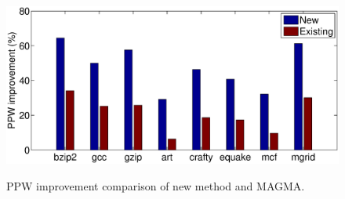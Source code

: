 



\begin{figure}
\centering
\includegraphics[width=1\linewidth]{fig/transient_ppw.eps}\label{fig:transient_ppw_spec}
\caption{PPW improvement comparison of new method and MAGMA.}
\end{figure}




